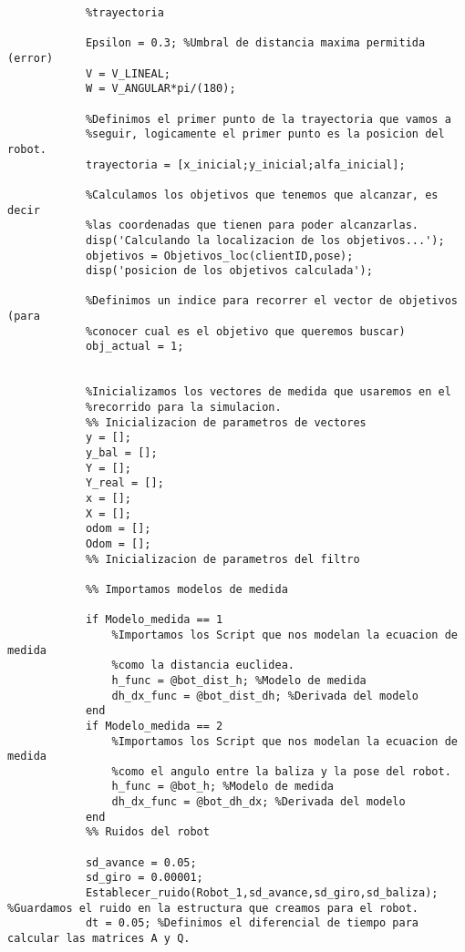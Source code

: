 \begin{lstlisting}[frame=single]
            %Definimos los parametros que nos ayudaran a calcular la
            %trayectoria

            Epsilon = 0.3; %Umbral de distancia maxima permitida (error)
            V = V_LINEAL;
            W = V_ANGULAR*pi/(180);

            %Definimos el primer punto de la trayectoria que vamos a
            %seguir, logicamente el primer punto es la posicion del robot.
            trayectoria = [x_inicial;y_inicial;alfa_inicial];

            %Calculamos los objetivos que tenemos que alcanzar, es decir
            %las coordenadas que tienen para poder alcanzarlas.
            disp('Calculando la localizacion de los objetivos...');
            objetivos = Objetivos_loc(clientID,pose);
            disp('posicion de los objetivos calculada');

            %Definimos un indice para recorrer el vector de objetivos (para
            %conocer cual es el objetivo que queremos buscar)
            obj_actual = 1;
            

            %Inicializamos los vectores de medida que usaremos en el
            %recorrido para la simulacion.
            %% Inicializacion de parametros de vectores
            y = [];
            y_bal = [];
            Y = [];
            Y_real = [];
            x = [];
            X = [];
            odom = [];
            Odom = [];
            %% Inicializacion de parametros del filtro
            
            %% Importamos modelos de medida
            
            if Modelo_medida == 1
                %Importamos los Script que nos modelan la ecuacion de medida
                %como la distancia euclidea.
                h_func = @bot_dist_h; %Modelo de medida
                dh_dx_func = @bot_dist_dh; %Derivada del modelo
            end
            if Modelo_medida == 2 
                %Importamos los Script que nos modelan la ecuacion de medida
                %como el angulo entre la baliza y la pose del robot.
                h_func = @bot_h; %Modelo de medida
                dh_dx_func = @bot_dh_dx; %Derivada del modelo
            end  
            %% Ruidos del robot
            
            sd_avance = 0.05;
            sd_giro = 0.00001;
            Establecer_ruido(Robot_1,sd_avance,sd_giro,sd_baliza); %Guardamos el ruido en la estructura que creamos para el robot.
            dt = 0.05; %Definimos el diferencial de tiempo para calcular las matrices A y Q.


\end{lstlisting}
